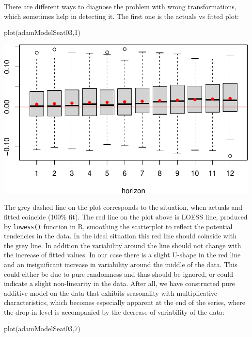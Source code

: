 \documentclass[
]{book}
\newenvironment{Shaded}{\begin{snugshade}}{\end{snugshade}}
\newcommand{\DecValTok}[1]{\textcolor[rgb]{0.00,0.00,0.81}{#1}}
\newcommand{\FunctionTok}[1]{\textcolor[rgb]{0.00,0.00,0.00}{#1}}
\newcommand{\NormalTok}[1]{#1}
\theoremstyle{definition}
\theoremstyle{definition}
\theoremstyle{definition}
\theoremstyle{definition}
\theoremstyle{remark}
\begin{document}
There are different ways to diagnose the problem with wrong transformations, which sometimes help in detecting it. The first one is the actuals vs fitted plot:

\begin{Shaded}
\begin{Highlighting}[]
\FunctionTok{plot}\NormalTok{(adamModelSeat03,}\DecValTok{1}\NormalTok{)}
\end{Highlighting}
\end{Shaded}

\includegraphics{adam_files/figure-latex/unnamed-chunk-136-1.pdf}

The grey dashed line on the plot corresponds to the situation, when actuals and fitted coincide (100\% fit). The red line on the plot above is LOESS line, produced by \texttt{lowess()} function in R, smoothing the scatterplot to reflect the potential tendencies in the data. In the ideal situation this red line should coinside with the grey line. In addition the variability around the line should not change with the increase of fitted values. In our case there is a slight U-shape in the red line and an insignificant increase in variability around the middle of the data. This could either be due to pure randomness and thus should be ignored, or could indicate a slight non-linearity in the data. After all, we have constructed pure additive model on the data that exhibits seasonality with multiplicative characteristics, which becomes especially apparent at the end of the series, where the drop in level is accompanied by the decrease of variability of the data:

\begin{Shaded}
\begin{Highlighting}[]
\FunctionTok{plot}\NormalTok{(adamModelSeat03,}\DecValTok{7}\NormalTok{)}
\end{Highlighting}
\end{Shaded}
\end{document}
